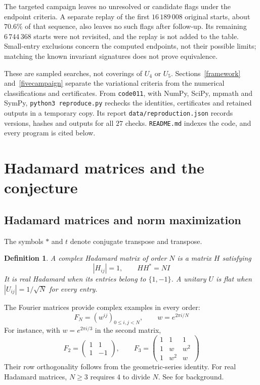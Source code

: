 \documentclass[11pt,a4paper]{article}
\newtheorem{defn}[thm]{Definition}
\begin{document}
The targeted campaign leaves no unresolved or candidate flags under
the endpoint criteria. A separate replay of the first $16\,189\,008$
original starts, about $70.6\%$ of that sequence, also leaves no such
flags after follow-up. Its remaining $6\,744\,368$ starts were not
revisited, and the replay is not added to the table. Small-entry
exclusions concern the computed endpoints, not their possible limits;
matching the known invariant signatures does not prove equivalence.

These are sampled searches, not coverings of $U_4$ or $U_5$.
Sections~\ref{framework} and~\ref{fivecampaign} separate the variational
criteria from the numerical classifications and certificates.
From \texttt{code011}, with NumPy, SciPy, mpmath and SymPy,
\texttt{python3 reproduce.py}
rechecks the identities, certificates and retained outputs in a
temporary copy. Its report \texttt{data/reproduction.json} records
versions, hashes and outputs for all $27$ checks.
\texttt{README.md} indexes the code, and every program is cited below.

\section{Hadamard matrices and the conjecture}\label{background}
\subsection{Hadamard matrices and norm maximization}
The symbols $*$ and $t$ denote conjugate transpose and transpose.

\begin{samepage}
\begin{defn}
A complex Hadamard matrix of order $N$ is a matrix $H$ satisfying
\[
 |H_{ij}|=1,\qquad HH^*=NI
\]
It is real Hadamard when its entries belong to $\{1,-1\}$.
A unitary $U$ is flat when $|U_{ij}|=1/\sqrt{N}$ for every entry.
\end{defn}
\end{samepage}

The Fourier matrices provide complex examples in every order:
\[
 F_N=(w^{ij})_{0\le i,j<N},\qquad w=e^{2\pi i/N}
\]
For instance, with $w=e^{2\pi i/3}$ in the second matrix,
\[
 F_2=\begin{pmatrix}1&1\\1&-1\end{pmatrix},\qquad
 F_3=\begin{pmatrix}1&1&1\\1&w&w^2\\1&w^2&w\end{pmatrix}
\]
Their row orthogonality follows from the geometric-series identity.
For real Hadamard matrices, $N\ge3$ requires $4$ to divide $N$.
See \cite{TZguide} for background.
\end{document}
